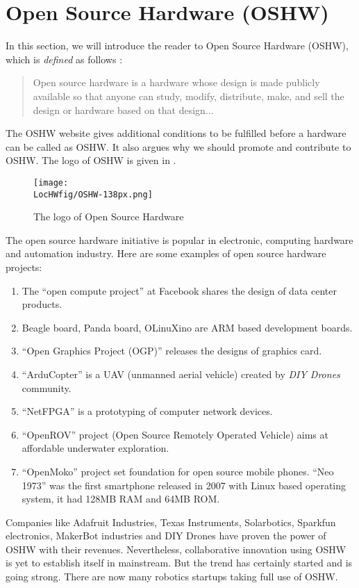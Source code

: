 \section{Open Source Hardware (OSHW)}
\label{sec:oshw}
In this section, we will introduce the reader to Open Source Hardware
(OSHW), which is 
\emph{defined} as follows \cite{oshw-ref}:
\begin{quote}
Open source hardware is a hardware whose design is made publicly
available so that anyone can study, modify, distribute, make, and sell
the design or hardware based on that design...
\end{quote}
The OSHW website \cite{oshw-ref} gives additional conditions to be
fulfilled before a hardware can be called as OSHW.  It also argues why
we should promote and contribute to OSHW.  The logo of OSHW is given
in  \cite{OSHW-logo-ref}.
\begin{figure}
\centering
\texttt{[image: \\LocHWfig/OSHW-138px.png]}
\caption{The logo of Open Source Hardware}
\label{fig:OSHW-logo}
\end{figure}
The open source hardware initiative is popular in electronic,
computing hardware and automation industry.  Here are some examples of
open source hardware projects:
\begin{enumerate}
\item The ``open compute project'' at Facebook shares the design of
  data center products.
\item Beagle board, Panda board, OLinuXino are ARM based development
  boards.
\item ``Open Graphics Project (OGP)'' releases the designs of
  graphics card.
\item ``ArduCopter'' is a UAV (unmanned aerial vehicle) created by
  \emph{DIY Drones} community.
\item ``NetFPGA'' is a prototyping of computer network devices.
\item ``OpenROV'' project (Open Source Remotely Operated Vehicle)
  aims at affordable underwater exploration.
\item ``OpenMoko'' project set foundation for open source mobile
  phones. ``Neo 1973'' was the first smartphone released in 2007
  with Linux based operating system, it had 128MB RAM and 64MB ROM.
\end{enumerate}

Companies like Adafruit Industries, Texas Instruments, Solarbotics,
Sparkfun electronics, MakerBot industries and DIY Drones have proven
the power of OSHW with their revenues.  Nevertheless, collaborative
innovation using OSHW is yet to establish itself in mainstream.  But
the trend has certainly started and is going strong.  There are now
many robotics startups taking full use of OSHW.


